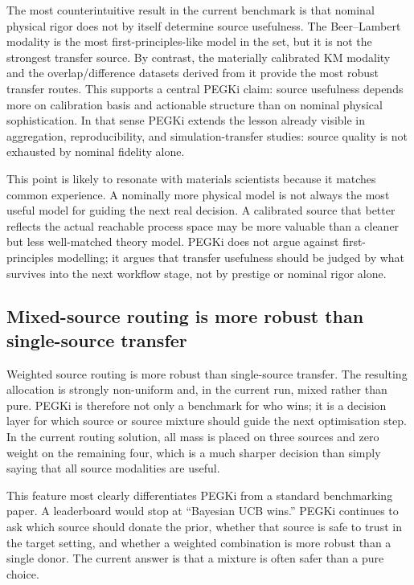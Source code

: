 \documentclass[twoside,twocolumn,9pt]{article}
\begin{document}
The most counterintuitive result in the current benchmark is that nominal physical rigor does not by itself determine source usefulness. The Beer--Lambert modality is the most first-principles-like model in the set, but it is not the strongest transfer source. By contrast, the materially calibrated KM modality and the overlap/difference datasets derived from it provide the most robust transfer routes. This supports a central PEGKi claim: source usefulness depends more on calibration basis and actionable structure than on nominal physical sophistication. In that sense PEGKi extends the lesson already visible in aggregation, reproducibility, and simulation-transfer studies: source quality is not exhausted by nominal fidelity alone.\cite{Ottomano2024DataAggregation,Lejaeghere2016Reproducibility,Gongora2021SimulationTransfer,Yoshida2025NetworkedAutonomous,Collins2025FUSE}

This point is likely to resonate with materials scientists because it matches common experience. A nominally more physical model is not always the most useful model for guiding the next real decision. A calibrated source that better reflects the actual reachable process space may be more valuable than a cleaner but less well-matched theory model. PEGKi does not argue against first-principles modelling; it argues that transfer usefulness should be judged by what survives into the next workflow stage, not by prestige or nominal rigor alone.

\subsection{Mixed-source routing is more robust than single-source transfer}

Weighted source routing is more robust than single-source transfer. The resulting allocation is strongly non-uniform and, in the current run, mixed rather than pure. PEGKi is therefore not only a benchmark for who wins; it is a decision layer for which source or source mixture should guide the next optimisation step. In the current routing solution, all mass is placed on three sources and zero weight on the remaining four, which is a much sharper decision than simply saying that all source modalities are useful.

This feature most clearly differentiates PEGKi from a standard benchmarking paper. A leaderboard would stop at ``Bayesian UCB wins.'' PEGKi continues to ask which source should donate the prior, whether that source is safe to trust in the target setting, and whether a weighted combination is more robust than a single donor. The current answer is that a mixture is often safer than a pure choice.
\end{document}
